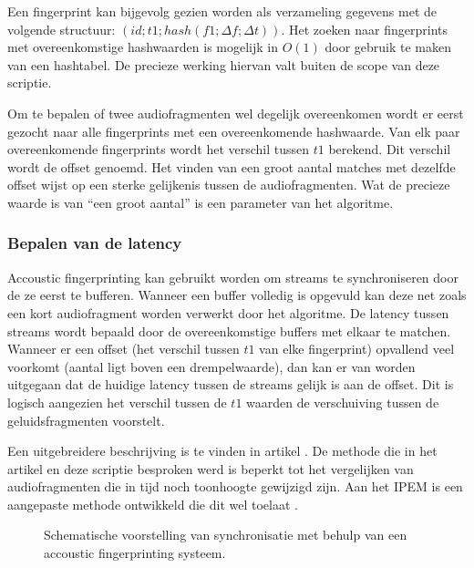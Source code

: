 Een fingerprint kan bijgevolg gezien worden als verzameling gegevens met de volgende structuur: $ ( id; t1; hash(f1; \Delta f; \Delta t) ) $. Het zoeken naar fingerprints met overeenkomstige hashwaarden is mogelijk in $O(1)$ door gebruik te maken van een hashtabel. De precieze werking hiervan valt buiten de scope van deze scriptie.

Om te bepalen of twee audiofragmenten wel degelijk overeenkomen wordt er eerst gezocht naar alle fingerprints met een overeenkomende hashwaarde. Van elk paar overeenkomende fingerprints wordt het verschil tussen $ t1 $ berekend. Dit verschil wordt de offset genoemd. Het vinden van een groot aantal matches met dezelfde offset wijst op een sterke gelijkenis tussen de audiofragmenten. Wat de precieze waarde is van ``een groot aantal'' is een parameter van het algoritme.

\subsubsection{Bepalen van de latency}

Accoustic fingerprinting kan gebruikt worden om streams te synchroniseren door de ze eerst te bufferen. Wanneer een buffer volledig is opgevuld kan deze net zoals een kort audiofragment worden verwerkt door het algoritme. De latency tussen streams wordt bepaald door de overeenkomstige buffers met elkaar te matchen. Wanneer er een offset (het verschil tussen $ t1 $ van elke fingerprint) opvallend veel voorkomt (aantal ligt boven een drempelwaarde), dan kan er van worden uitgegaan dat de huidige latency tussen de streams gelijk is aan de offset. Dit is logisch aangezien het verschil tussen de $ t1 $ waarden de verschuiving tussen de geluidsfragmenten voorstelt.

Een uitgebreidere beschrijving is te vinden in artikel \cite{Wang2003a}. De methode die in het artikel en deze scriptie besproken werd is beperkt tot het vergelijken van audiofragmenten die in tijd noch toonhoogte gewijzigd zijn. Aan het IPEM is een aangepaste methode ontwikkeld die dit wel toelaat \cite{six2014panako}.

\begin{figure}[h]
	\captionsetup{width=0.7\textwidth}
	\caption[Schema synchronisatie met fingerprinting]{Schematische voorstelling van synchronisatie met behulp van een accoustic fingerprinting systeem.}
	\advance\parskip0.5cm
	
	\advance\parskip1cm
\end{figure}
\vspace{2.5cm}

